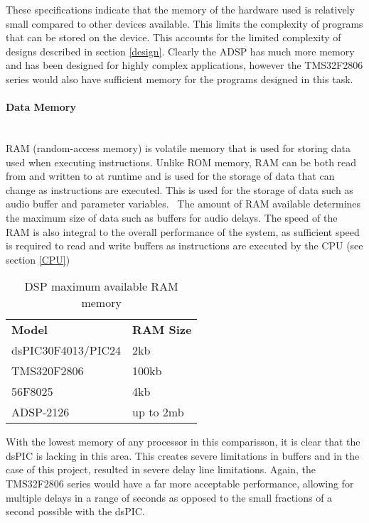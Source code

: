 \documentclass[titlepage]{scrartcl}
\begin{document}
    These specifications indicate that the memory of the hardware used is
    relatively small compared to other devices available. This limits the
    complexity of programs that can be stored on the device. This accounts for
    the limited complexity of designs described in section \ref{design}.
    Clearly the ADSP has much more memory and has been designed for highly
    complex applications, however the TMS32F2806 series would also have
    sufficient memory for the programs designed in this task.


    \paragraph{Data Memory}~\\
    RAM (random-access memory) is volatile memory that is used for storing data
    used when executing instructions. Unlike ROM memory, RAM can be both read
    from and written to at runtime and is used for the storage of data that can
    change as instructions are executed. This is used for the storage of data
    such as audio buffer and parameter
    variables.~\parencite[p.317]{raf2014fdlm} The amount of RAM available
    determines the maximum size of data such as buffers for audio delays. The
    speed of the RAM is also integral to the overall performance of the system,
    as sufficient speed is required to read and write buffers as instructions
    are executed by the CPU (see section \ref{CPU})

    \begin{table}[H]
    \centering
    \caption{DSP maximum available RAM memory}
    \label{my-label}
    \begin{tabular}{ll}
        \textbf{Model}     & \textbf{RAM Size}\\
        dsPIC30F4013/PIC24 & 2kb      \\
        TMS320F2806        & 100kb     \\
        56F8025            & 4kb      \\
        ADSP-2126          & up to 2mb
    \end{tabular}
    \end{table}

    With the lowest memory of any processor in this comparisson, it is clear
    that the dsPIC is lacking in this area. This creates severe limitations in
    buffers and in the case of this project, resulted in severe delay line
    limitations. Again, the TMS32F2806 series would have a far more acceptable
    performance, allowing for multiple delays in a range of seconds as opposed
    to the small fractions of a second possible with the dsPIC.
\end{document}
